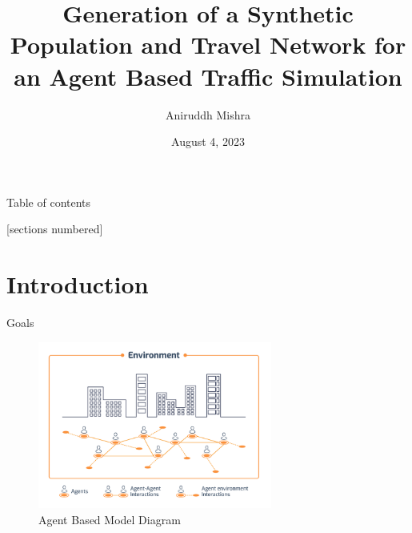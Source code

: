 \documentclass[10pt, aspectratio=169]{beamer}
\title{Generation of a Synthetic Population and Travel Network for an Agent Based Traffic Simulation}
\author{Aniruddh Mishra}
\date{August 4, 2023}
\institute{Institute for Computing in Research}
\begin{document}
    \maketitle
    
    \begin{frame}{Table of contents}
        \begin{adjustwidth}{3em}{-1em}
            [sections numbered]
            \begin{multicols}{2}
                \setlength{\parskip}{2em}
                \tableofcontents
            \end{multicols}
        \end{adjustwidth}
    \end{frame}
    
    \section{Introduction}
    
    \begin{frame}[fragile]{Goals}
        \begin{center}
            \begin{figure}
                \centering
                \includegraphics[height=5.5cm, keepaspectratio]{images/agent-based-model.png}
                \caption{Agent Based Model Diagram \cite{agentbasedmodel}}
            \end{figure}
        \end{center}
    \end{frame}
    
\end{document}
